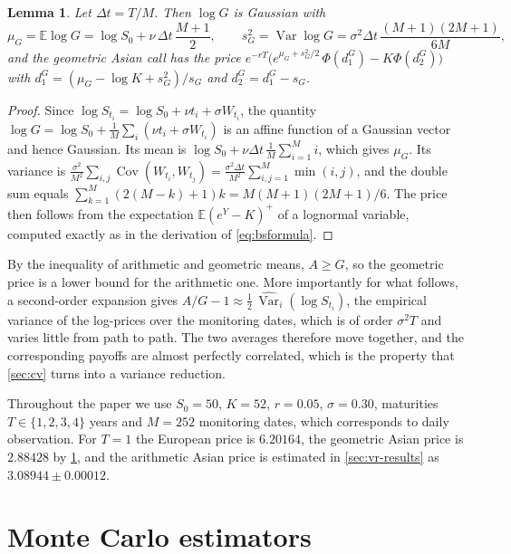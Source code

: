 \documentclass[11pt,a4paper]{article}
\newtheorem{lemma}[proposition]{Lemma}
\newcommand{\E}{\mathbb{E}}
\newcommand{\Var}{\operatorname{Var}}
\newcommand{\Cov}{\operatorname{Cov}}
\begin{document}
\begin{lemma}\label{lem:geo}
Let $\Delta t = T/M$. Then $\log G$ is Gaussian with
\begin{equation}\label{eq:geo}
\mu_G = \E\log G = \log S_0 + \nu\,\Delta t\,\frac{M+1}{2},\qquad
s_G^2 = \Var\log G = \sigma^2 \Delta t\,\frac{(M+1)(2M+1)}{6M},
\end{equation}
and the geometric Asian call has the price $e^{-rT}\big(e^{\mu_G+s_G^2/2}\,\Phi(d_1^G) - K\Phi(d_2^G)\big)$ with $d_1^G = (\mu_G-\log K+s_G^2)/s_G$ and $d_2^G = d_1^G - s_G$.
\end{lemma}

\begin{proof}
Since $\log S_{t_i} = \log S_0 + \nu t_i + \sigma W_{t_i}$, the quantity $\log G = \log S_0 + \frac1M\sum_i(\nu t_i + \sigma W_{t_i})$ is an affine function of a Gaussian vector and hence Gaussian.
Its mean is $\log S_0 + \nu\Delta t\,\frac1M\sum_{i=1}^M i$, which gives $\mu_G$.
Its variance is $\frac{\sigma^2}{M^2}\sum_{i,j}\Cov(W_{t_i},W_{t_j}) = \frac{\sigma^2\Delta t}{M^2}\sum_{i,j=1}^M \min(i,j)$, and the double sum equals $\sum_{k=1}^M (2(M-k)+1)k = M(M+1)(2M+1)/6$.
The price then follows from the expectation $\E(e^Y-K)^+$ of a lognormal variable, computed exactly as in the derivation of \cref{eq:bsformula}.
\end{proof}

By the inequality of arithmetic and geometric means, $A\ge G$, so the geometric price is a lower bound for the arithmetic one.
More importantly for what follows, a second-order expansion gives $A/G - 1 \approx \frac12\,\widehat{\Var}_i(\log S_{t_i})$, the empirical variance of the log-prices over the monitoring dates, which is of order $\sigma^2T$ and varies little from path to path.
The two averages therefore move together, and the corresponding payoffs are almost perfectly correlated, which is the property that \cref{sec:cv} turns into a variance reduction.

Throughout the paper we use $S_0=50$, $K=52$, $r=0.05$, $\sigma=0.30$, maturities $T\in\{1,2,3,4\}$ years and $M=252$ monitoring dates, which corresponds to daily observation.
For $T=1$ the European price is $6.20164$, the geometric Asian price is $2.88428$ by \cref{lem:geo}, and the arithmetic Asian price is estimated in \cref{sec:vr-results} as $3.08944\pm0.00012$.

\section{Monte Carlo estimators}\label{sec:mc}
\end{document}
